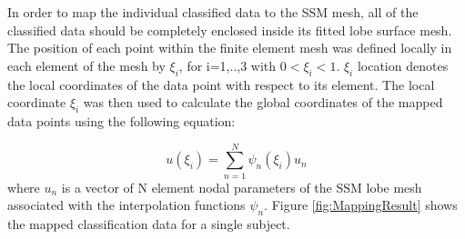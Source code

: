 In order to map the individual classified data to the SSM mesh, all of the classified data should be completely enclosed inside its fitted lobe surface mesh. The position of each point within the finite element mesh was defined locally in each element of the mesh by $\xi_{i}$, for i=1,..,3 with $0<\xi_{i}<1$. $\xi_{i}$ location denotes the local coordinates of the data point with respect to its element. The local coordinate $\xi_{i}$ was then used to calculate the global coordinates of the mapped data points using the following equation:

\begin{equation}
u(\xi_{i}) = \sum_{n=1}^{N} \psi_n(\xi_{i})u_n
\end{equation}
where $u_n$ is a vector of N element nodal parameters of the SSM lobe mesh associated with the interpolation functions $\psi_{n}$. Figure \ref{fig:MappingResult} shows the mapped classification data for a single subject.

